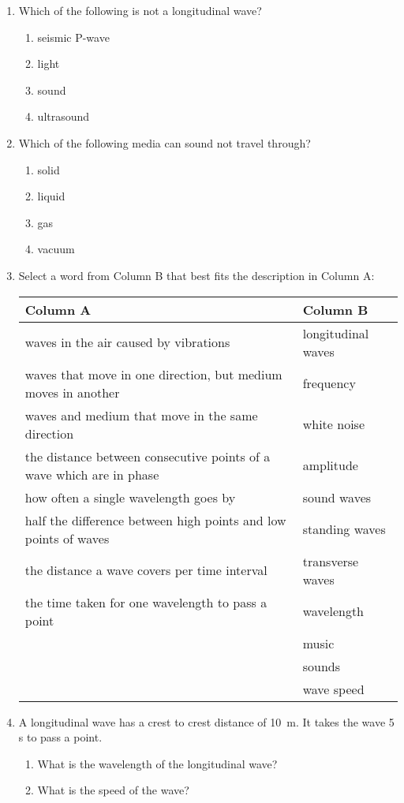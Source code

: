 \begin{eocexercises}{}
\begin{enumerate}
\item{Which of the following is not a longitudinal wave?
\begin{enumerate}
\item{seismic P-wave}
\item{light}
\item{sound}
\item{ultrasound}
\end{enumerate}}

\item{Which of the following media can sound not travel through?
\begin{enumerate}
\item solid
\item liquid
\item gas
\item vacuum
\end{enumerate}}

\item{Select a word from Column B that best fits the description in Column A:

\begin{center}
\begin{tabular}{ll}
\textbf{Column A} & \textbf{Column B} \\ \hline
waves in the air caused by vibrations & longitudinal waves \\
waves that move in one direction, but medium moves in another & frequency \\
waves and medium that move in the same direction & white noise \\
the distance between consecutive points of a wave which are in phase & amplitude \\
how often a single wavelength goes by & sound waves \\
half the difference between high points and low points of waves & standing waves \\
the distance a wave covers per time interval & transverse waves \\
the time taken for one wavelength to pass a point & wavelength \\
& music \\
& sounds \\
& wave speed \\
\end{tabular}
\end{center}
}
\item{A longitudinal wave has a crest to crest distance of 10~m. It takes the wave 5 s to pass a point.
\begin{enumerate}
\item What is the wavelength of the longitudinal wave?
\item What is the speed of the wave?
\end{enumerate}}


\end{enumerate}
\end{eocexercises}
